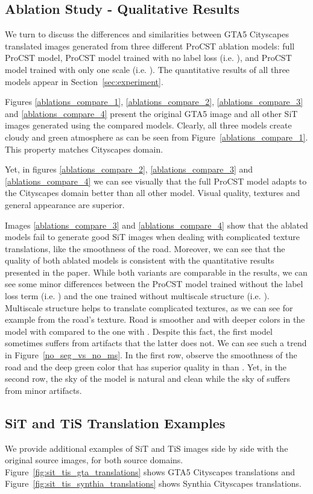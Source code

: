 \documentclass[letterpaper]{article} \usepackage[]{aaai23}  \usepackage{times}  \usepackage{helvet}  \usepackage{courier}  \usepackage[hyphens]{url}  \usepackage{graphicx} \urlstyle{rm} \def\UrlFont{\rm}  \usepackage{natbib}  \usepackage{caption} \frenchspacing  \setlength{\pdfpagewidth}{8.5in} \setlength{\pdfpageheight}{11in} \usepackage{algorithm}
\begin{document}
\subsection{Ablation Study - Qualitative Results}
We turn to discuss the differences and similarities between GTA5  Cityscapes translated images generated from three different ProCST ablation models: full ProCST model, ProCST model trained with no label loss (i.e. ), and ProCST model trained with only one scale (i.e. ). The quantitative results of all three models appear in Section~\ref{sec:experiment}.

Figures \ref{ablations_compare_1}, \ref{ablations_compare_2}, \ref{ablations_compare_3} and \ref{ablations_compare_4} present the original GTA5 image and all other SiT images generated using the compared models. Clearly, all three models create cloudy and green atmosphere as can be seen from Figure~\ref{ablations_compare_1}. This property matches Cityscapes domain.

Yet, in figures \ref{ablations_compare_2}, \ref{ablations_compare_3} and  \ref{ablations_compare_4} we can see visually that the full ProCST model adapts to the Cityscapes domain better than all other model. Visual quality, textures and general appearance are superior.  

Images \ref{ablations_compare_3} and \ref{ablations_compare_4} show that the ablated models fail to generate good SiT images when dealing with complicated texture translations, like the smoothness of the road.
Moreover, we can see that the quality of both ablated models is consistent with the quantitative results presented in the paper. While both variants are comparable in the results, we can see some minor differences between the ProCST model trained without the label loss term (i.e. ) and the one trained without multiscale structure (i.e. ). Multiscale structure helps to translate complicated textures, as we can see for example from the road's texture. Road is smoother and with deeper colors in the model with  compared to the one with . Despite this fact, the first model sometimes suffers from artifacts that the latter does not. We can see such a trend in Figure~\ref{no_seg_vs_no_ms}. In the first row, observe the smoothness of the road and the deep green color that has superior quality in  than . Yet, in the second row, the sky of the  model is natural and clean while the sky of  suffers from minor artifacts.


\subsection{SiT and TiS Translation Examples}
We provide additional examples of SiT and TiS images side by side with the original source images, for both source domains. Figure~\ref{fig:sit_tis_gta_translations} shows GTA5  Cityscapes translations and Figure~\ref{fig:sit_tis_synthia_translations} shows Synthia  Cityscapes translations.
\end{document}
